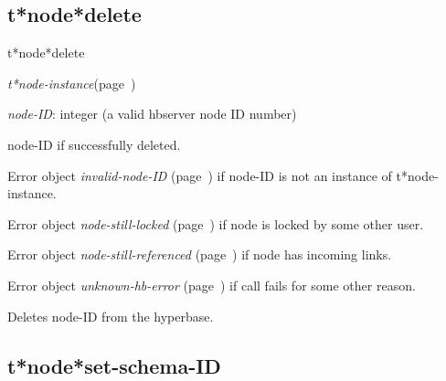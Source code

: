 \subsection{t*node*delete}
\label{t*node*delete}

\begin{description}
\item [Name:]  t*node*delete

\item [Class:] {\sl t*node-instance}\hfill(page~\pageref{t*node-instance})

\item [Parameters:]
\item {\sl node-ID}:  
integer (a valid hbserver node ID number)


\item [Return-value:]
node-ID if successfully deleted.

Error object {\sl invalid-node-ID} (page~\pageref{invalid-node-ID}) if node-ID is 
not an instance of t*node-instance.

Error object {\sl node-still-locked} (page~\pageref{node-still-locked}) if node is locked
by some other user. 

Error object {\sl node-still-referenced} (page~\pageref{node-still-referenced}) if node
has incoming links. 

Error object {\sl unknown-hb-error} (page~\pageref{unknown-hb-error}) if call fails
for some other reason.

\item [Description:]

Deletes node-ID from the hyperbase.

\item [Public:]



\end{description}
\horizontalline

\subsection{t*node*set-schema-ID}
\label{t*node*set-schema-ID}

